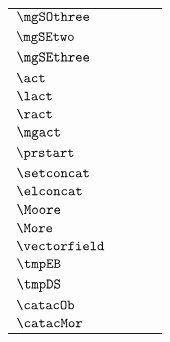\begin{longtable}{lllr}
 $\mgSOthree$ &  &  & \\ 
 $\mgSEtwo$ &  &  & \\ 
 $\mgSEthree$ &  &  & \\ 
 $\act$ &  &  & \\ 
 $\lact$ &  &  & \\ 
 $\ract$ &  &  & \\ 
 $\mgact$ &  &  & \\ 
 $\prstart$ &  &  & \\ 
 $\setconcat$ &  &  & \\ 
 $\elconcat$ &  &  & \\ 
 $\Moore$ &  &  & \\ 
 $\More$ &  &  & \\ 
 $\vectorfield$ &  &  & \\ 
 $\tmpEB$ &  &  & \\ 
 $\tmpDS$ &  &  & \\ 
 $\catacOb$ &  &  & \\ 
 $\catacMor$ &  &  & \\ 
 \end{longtable}
